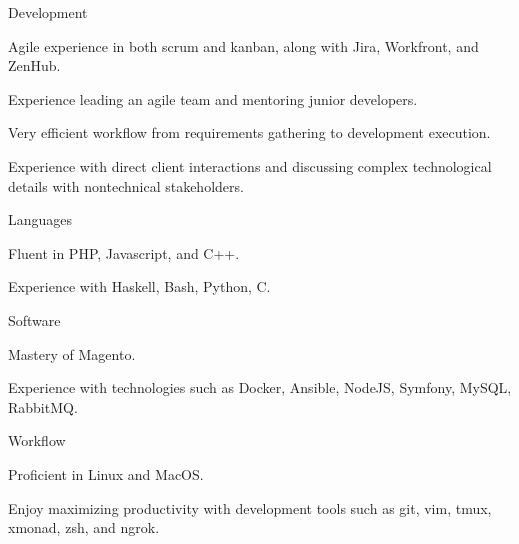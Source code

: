 \begin{cvskills}
  \cvskill
    {Development}
    {
      \begin{cvitems}
        \item Agile experience in both scrum and kanban, along with Jira, Workfront, and ZenHub.
        \item Experience leading an agile team and mentoring junior developers.
        \item Very efficient workflow from requirements gathering to development execution.
        \item Experience with direct client interactions and discussing complex technological details with nontechnical stakeholders.
      \end{cvitems}
    }
  \cvskill
    {Languages}
    {
      \begin{cvitems}
        \item Fluent in PHP, Javascript, and C++.
        \item Experience with Haskell, Bash, Python, C.
      \end{cvitems}
    }
  \cvskill
    {Software}
    {
      \begin{cvitems}
        \item Mastery of Magento.
        \item Experience with technologies such as Docker, Ansible, NodeJS, Symfony, MySQL, RabbitMQ.
      \end{cvitems}
    }
  \cvskill
    {Workflow}
    {
      \begin{cvitems}
        \item Proficient in Linux and MacOS.
        \item Enjoy maximizing productivity with development tools such as git, vim, tmux, xmonad, zsh, and ngrok.
      \end{cvitems}
    }
\end{cvskills}
